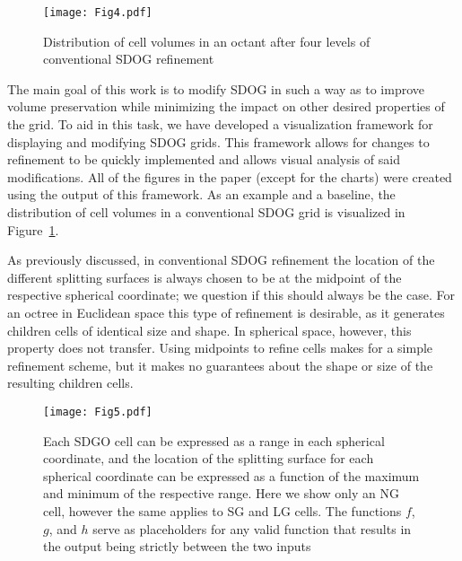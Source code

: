 \begin{figure}[tb]
	\texttt{[image: Fig4.pdf]}
	\caption[Title]{
		Distribution of cell volumes in an octant after four levels of conventional SDOG refinement
	}
	\label{fig:sdog-vol}
\end{figure}


The main goal of this work is to modify SDOG in such a way as to improve volume preservation while minimizing the impact on other desired properties of the grid.
To aid in this task, we have developed a visualization framework for displaying and modifying SDOG grids.
This framework allows for changes to refinement to be quickly implemented and allows visual analysis of said modifications.
All of the figures in the paper (except for the charts) were created using the output of this framework.
As an example and a baseline, the distribution of cell volumes in a conventional SDOG grid is visualized in Figure~\ref{fig:sdog-vol}.


As previously discussed, in conventional SDOG refinement the location of the different splitting surfaces is always chosen to be at the midpoint of the respective spherical coordinate; we question if this should always be the case.
For an octree in Euclidean space this type of refinement is desirable, as it generates children cells of identical size and shape.
In spherical space, however, this property does not transfer.
Using midpoints to refine cells makes for a simple refinement scheme, but it makes no guarantees about the shape or size of the resulting children cells.


\begin{figure}[tb]
	\texttt{[image: Fig5.pdf]}
	\caption[Title]{
		Each SDGO cell can be expressed as a range in each spherical coordinate, and the location of the splitting surface for each spherical coordinate can be expressed as a function of the maximum and minimum of the respective range.
		Here we show only an NG cell, however the same applies to SG and LG cells.
		The functions $f$, $g$, and $h$ serve as placeholders for any valid function that results in the output being strictly between the two inputs
	}
	\label{fig:functions}
\end{figure}


